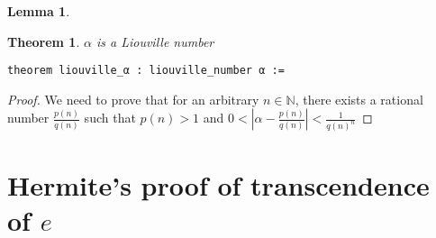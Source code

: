 \documentclass{report}
\theoremstyle{definition}
\newtheorem{lemma}{Lemma}[section]
\theoremstyle{plain}
\newtheorem{theorem}{Theorem}[section]
\begin{document}
\begin{lemma}
\end{lemma}

\begin{theorem}
$\alpha$ is a Liouville number
\begin{verbatim}
theorem liouville_α : liouville_number α :=
\end{verbatim}
\end{theorem}
\begin{proof}
We need to prove that for an arbitrary $n\in\mathbb N$, there exists a rational number $\frac{p(n)}{q(n)}$ such that $p(n)>1$ and $0 < \left|\alpha-\frac{p(n)}{q(n)}\right|<\frac{1}{q(n)^n}$
\end{proof}

\section{Hermite's proof of transcendence of $e$}\label{fmlsn:e}



%


\nocite{*}
\printbibliography[heading=bibintoc]

\end{document}
